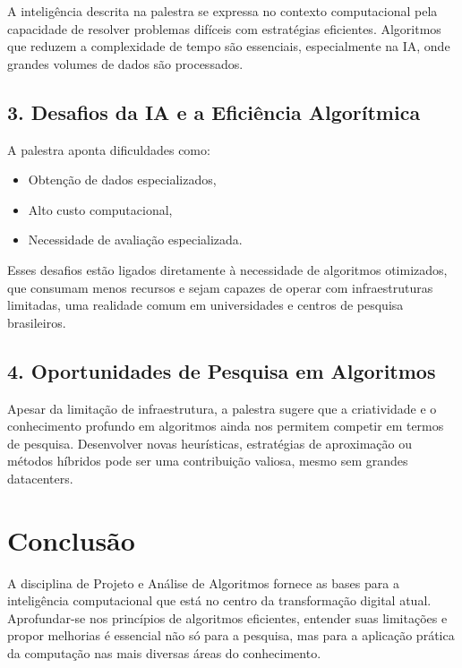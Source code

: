 \documentclass[12pt]{article}
\begin{document}
A inteligência descrita na palestra se expressa no contexto computacional pela capacidade de resolver problemas difíceis com estratégias eficientes. Algoritmos que reduzem a complexidade de tempo são essenciais, especialmente na IA, onde grandes volumes de dados são processados.

\subsection*{3. Desafios da IA e a Eficiência Algorítmica}

A palestra aponta dificuldades como:
\begin{itemize}
    \item Obtenção de dados especializados,
    \item Alto custo computacional,
    \item Necessidade de avaliação especializada.
\end{itemize}

Esses desafios estão ligados diretamente à necessidade de algoritmos otimizados, que consumam menos recursos e sejam capazes de operar com infraestruturas limitadas, uma realidade comum em universidades e centros de pesquisa brasileiros.

\subsection*{4. Oportunidades de Pesquisa em Algoritmos}

Apesar da limitação de infraestrutura, a palestra sugere que a criatividade e o conhecimento profundo em algoritmos ainda nos permitem competir em termos de pesquisa. Desenvolver novas heurísticas, estratégias de aproximação ou métodos híbridos pode ser uma contribuição valiosa, mesmo sem grandes datacenters.

\section*{Conclusão}

A disciplina de Projeto e Análise de Algoritmos fornece as bases para a inteligência computacional que está no centro da transformação digital atual. Aprofundar-se nos princípios de algoritmos eficientes, entender suas limitações e propor melhorias é essencial não só para a pesquisa, mas para a aplicação prática da computação nas mais diversas áreas do conhecimento.
\end{document}
